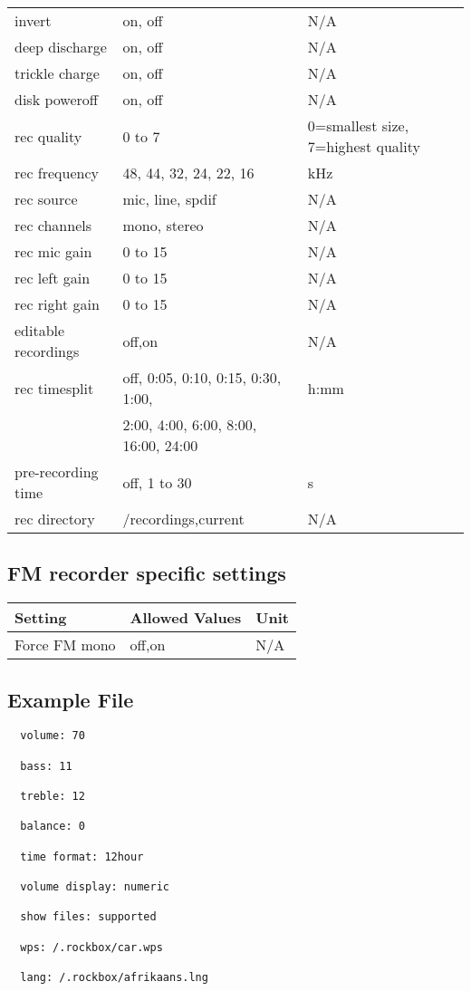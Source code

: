 \begin{center}
\begin{tabular}{@{}lll@{}}
     invert & on, off & N/A\\
     deep discharge & on, off & N/A\\
     trickle charge & on, off & N/A\\
     disk poweroff & on, off & N/A\\
     rec quality & 0 to 7 & 0=smallest size, 7=highest quality\\
     rec frequency & 48, 44, 32, 24, 22, 16 & kHz\\
     rec source & mic, line, spdif & N/A\\
     rec channels & mono, stereo & N/A\\
     rec mic gain & 0 to 15 & N/A\\
     rec left gain & 0 to 15 & N/A\\
     rec right gain & 0 to 15 & N/A\\
     editable recordings & off,on & N/A\\
     rec timesplit & off, 0:05, 0:10, 0:15, 0:30, 1:00, & h:mm\\
                   & 2:00, 4:00, 6:00, 8:00, 16:00, 24:00 & \\
     pre-recording time & off, 1 to 30 & s\\
     rec directory & /recordings,current & N/A\\\bottomrule
    \end{tabular}
\end{center}

\subsection{FM recorder specific settings}
\begin{center}
  \begin{tabular}{@{}lll@{}}\toprule
    \textbf{Setting} & \textbf{Allowed Values} & \textbf{Unit}\\\midrule
    Force FM mono & off,on & N/A\\\bottomrule
  \end{tabular}
\end{center}

\subsection{Example File}
\begin{verbatim}
  volume: 70
  
  bass: 11

  treble: 12
  
  balance: 0
  
  time format: 12hour

  volume display: numeric

  show files: supported
  
  wps: /.rockbox/car.wps
  
  lang: /.rockbox/afrikaans.lng
\end{verbatim}

